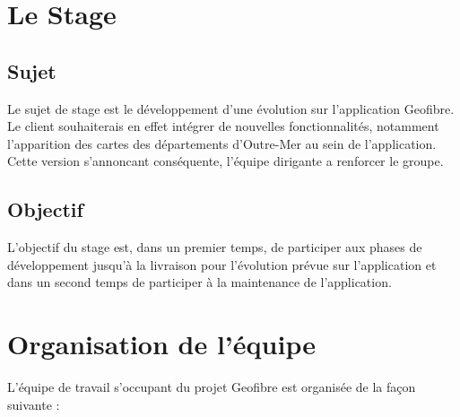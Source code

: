 \chapter{Le Stage}
\section{Sujet}

Le sujet de stage est le développement d'une évolution sur l'application Geofibre. Le client souhaiterais en effet intégrer de nouvelles fonctionnalités, notamment l'apparition des cartes des départements d'Outre-Mer au sein de l'application.
\\Cette version s'annoncant conséquente, l'équipe dirigante a renforcer le groupe.

\section{Objectif}


L'objectif du stage est, dans un premier temps, de participer aux phases de développement jusqu'à la livraison pour l'évolution prévue sur l'application et dans un second temps de participer à la maintenance de l'application.

\chapter{Organisation de l'équipe}

L'équipe de travail s'occupant du projet Geofibre est organisée de la façon suivante :\\

